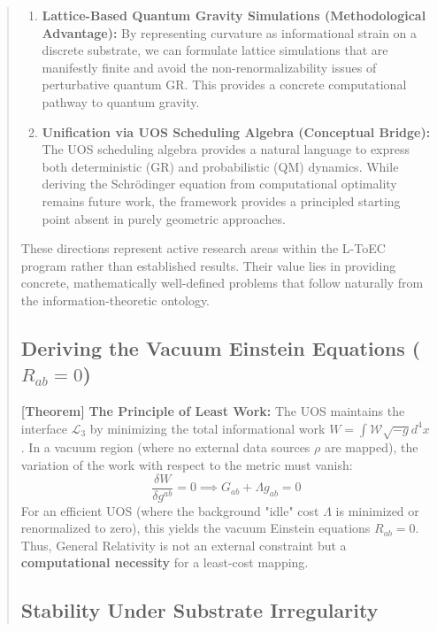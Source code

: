 \documentclass[11pt,titlepage]{article}
\newcommand{\interface}{\mathcal{L}_3}
\newcommand{\tagtheo}{\textcolor{green!60!black}{\textbf{[Theorem]}} }
\begin{document}
\begin{abstract}
\begin{enumerate}
    \item \textbf{Lattice-Based Quantum Gravity Simulations (Methodological Advantage):} By representing curvature as informational strain on a discrete substrate, we can formulate lattice simulations that are manifestly finite and avoid the non-renormalizability issues of perturbative quantum GR. This provides a concrete computational pathway to quantum gravity.
    
    \item \textbf{Unification via UOS Scheduling Algebra (Conceptual Bridge):} The UOS scheduling algebra provides a natural language to express both deterministic (GR) and probabilistic (QM) dynamics. While deriving the Schr\"odinger equation from computational optimality remains future work, the framework provides a principled starting point absent in purely geometric approaches.
\end{enumerate}

These directions represent active research areas within the L-ToEC program rather than established results. Their value lies in providing concrete, mathematically well-defined problems that follow naturally from the information-theoretic ontology.
\subsection{Deriving the Vacuum Einstein Equations (\texorpdfstring{$R_{ab}=0$}{Rab=0})}
\tagtheo \textbf{The Principle of Least Work:} The UOS maintains the interface $\interface$ by minimizing the total informational work $W = \int \mathcal{W} \sqrt{-g} d^4x$. In a vacuum region (where no external data sources $\rho$ are mapped), the variation of the work with respect to the metric must vanish:
\begin{equation}
\frac{\delta W}{\delta g^{ab}} = 0 \implies G_{ab} + \Lambda g_{ab} = 0
\end{equation}
For an efficient UOS (where the background "idle" cost $\Lambda$ is minimized or renormalized to zero), this yields the vacuum Einstein equations $R_{ab} = 0$. Thus, General Relativity is not an external constraint but a \textbf{computational necessity} for a least-cost mapping.

\subsection{Stability Under Substrate Irregularity}


\end{abstract}
\end{document}

